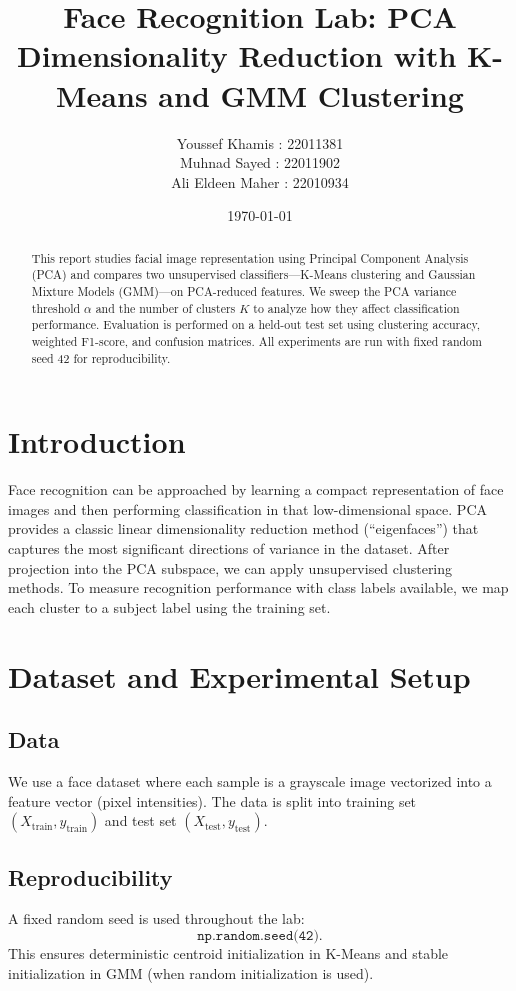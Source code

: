 \documentclass[11pt,a4paper]{article}
\title{Face Recognition Lab: PCA Dimensionality Reduction with K-Means and GMM Clustering}
\author{
   Youssef Khamis : 22011381\\
   Muhnad Sayed : 22011902\\
   Ali Eldeen Maher : 22010934
}
\date{\today}
\begin{document}
\maketitle

\begin{abstract}
This report studies facial image representation using Principal Component Analysis (PCA) and compares two unsupervised classifiers---K-Means clustering and Gaussian Mixture Models (GMM)---on PCA-reduced features. We sweep the PCA variance threshold $\alpha$ and the number of clusters $K$ to analyze how they affect classification performance. Evaluation is performed on a held-out test set using clustering accuracy, weighted F1-score, and confusion matrices. All experiments are run with fixed random seed 42 for reproducibility.
\end{abstract}

\section{Introduction}
Face recognition can be approached by learning a compact representation of face images and then performing classification in that low-dimensional space. PCA provides a classic linear dimensionality reduction method (``eigenfaces'') that captures the most significant directions of variance in the dataset. After projection into the PCA subspace, we can apply unsupervised clustering methods. To measure recognition performance with class labels available, we map each cluster to a subject label using the training set.

\section{Dataset and Experimental Setup}
\subsection{Data}
We use a face dataset where each sample is a grayscale image vectorized into a feature vector (pixel intensities). The data is split into training set $(X_{\text{train}}, y_{\text{train}})$ and test set $(X_{\text{test}}, y_{\text{test}})$.

\subsection{Reproducibility}
A fixed random seed is used throughout the lab:
\begin{equation}
\texttt{np.random.seed(42)}.
\end{equation}
This ensures deterministic centroid initialization in K-Means and stable initialization in GMM (when random initialization is used).
\end{document}
